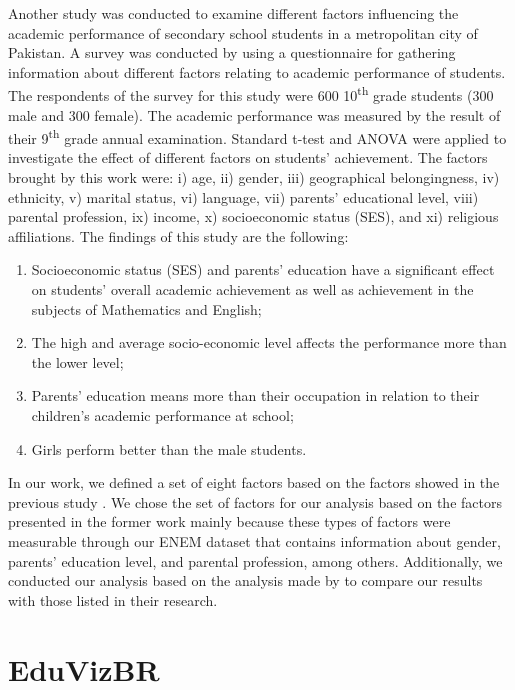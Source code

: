 \documentclass[12pt]{article}
\begin{document}
Another study \cite{Farooq2012FACTORSAS} was conducted to examine different factors influencing the academic performance of secondary school students in a metropolitan city of Pakistan. A survey was conducted by using a questionnaire for gathering information about different factors relating to academic performance of students. The respondents of the survey for this study were 600 10\textsuperscript{th} grade students (300 male and 300 female). The academic performance was measured by the result of their 9\textsuperscript{th} grade annual examination. Standard t-test and ANOVA were applied to investigate the effect of different factors on students’ achievement. The factors brought by this work were: i) age, ii) gender, iii) geographical belongingness, iv) ethnicity, v) marital status, vi) language, vii) parents’ educational level, viii) parental profession, ix) income, x) socioeconomic status (SES), and xi) religious affiliations. The findings of this study are the following: 

\begin{enumerate}
    \item Socioeconomic status (SES) and parents’ education have a significant effect on students’ overall academic achievement as  well as achievement in the subjects of Mathematics and English;  

    \item The high and average socio-economic level affects the performance more than the lower level;  

    \item Parents’ education means more than their occupation in relation to their children’s academic performance at school;

    \item Girls perform better than the male students.    
\end{enumerate}

In our work, we defined a set of eight factors based on the factors showed in the previous study \cite{Farooq2012FACTORSAS}. We chose the set of factors for our analysis based on the factors presented in the former work mainly because these types of factors were measurable through our ENEM dataset that contains information about gender, parents' education level, and parental profession, among others. Additionally, we conducted our analysis based on the analysis made by \cite{Farooq2012FACTORSAS} to compare our results with those listed in their research.  

\section{EduVizBR} 
\end{document}
